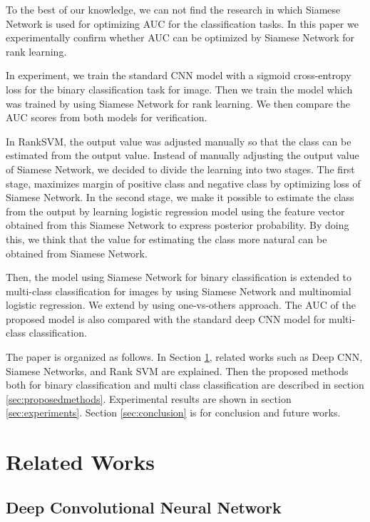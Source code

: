 \documentclass[runningheads,a4paper]{llncs}
\begin{document}
To the best of our knowledge, we can not find the research in which Siamese Network is used for optimizing AUC for the classification tasks.
In this paper we experimentally confirm whether AUC can be optimized by Siamese Network for rank learning.

In experiment, we train the standard CNN model with a sigmoid cross-entropy loss for the binary classification task for image.
Then we train the model which was trained by using Siamese Network for rank learning.
We then compare the AUC scores from both models for verification.

In RankSVM, the output value was adjusted manually so that the class can be estimated from the output value.
Instead of manually adjusting the output value of Siamese Network, we decided to divide the learning into two stages.
The first stage, maximizes margin of positive class and negative class by optimizing loss of Siamese Network.
In the second stage, we make it possible to estimate the class from the output by learning logistic regression model using the feature vector obtained from this Siamese Network to express posterior probability.
By doing this, we think that the value for estimating the class more natural can be obtained from Siamese Network.

Then, the model using Siamese Network for binary classification is extended to multi-class classification for images by using Siamese Network and multinomial logistic regression. 
We extend by using one-vs-others approach.
The AUC of the proposed model is also compared with the standard deep CNN model for multi-class classification.

The paper is organized as follows. In Section \ref{sec:relatedworks}, related works such as Deep CNN, Siamese Networks, and Rank SVM are explained. Then the proposed methods both for binary classification and multi class classification are described in section \ref{sec:proposedmethods}. Experimental results are shown in section \ref{sec:experiments}. Section \ref{sec:conclusion} is for conclusion and future works.

\section{Related Works}
\label{sec:relatedworks}

\subsection{Deep Convolutional Neural Network}
\end{document}
